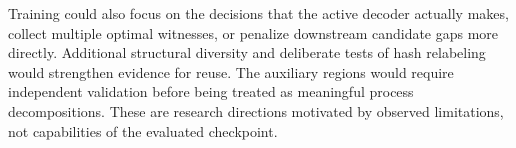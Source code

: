 Training could also focus on the decisions that the active decoder actually makes, collect multiple optimal witnesses, or penalize downstream candidate gaps more directly. Additional structural diversity and deliberate tests of hash relabeling would strengthen evidence for reuse. The auxiliary regions would require independent validation before being treated as meaningful process decompositions. These are research directions motivated by observed limitations, not capabilities of the evaluated checkpoint.

